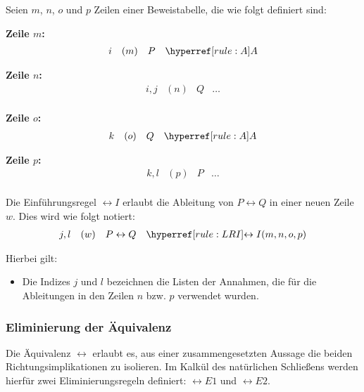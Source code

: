 \documentclass[main.tex]{subfiles}
\begin{document}
\begin{definition}
Seien \( m \), \( n \), \( o \) und \( p \) Zeilen einer Beweistabelle, die wie folgt definiert sind:

\textbf{Zeile \( m \):}
\[
\begin{array}{llll}
    i & (m) & P & \rA \\
\end{array}
\]

\textbf{Zeile \( n \):}
\[
\begin{array}{llll}
    i,j & (n) & Q & \dots \\
\end{array}
\]

\textbf{Zeile \( o \):}
\[
\begin{array}{llll}
    k & (o) & Q & \rA \\
\end{array}
\]

\textbf{Zeile \( p \):}
\[
\begin{array}{llll}
    k,l & (p) & P & \dots \\
\end{array}
\]

Die Einführungsregel \(\leftrightarrow I\) erlaubt die Ableitung von \( P \leftrightarrow Q \) in einer neuen Zeile \( w \). Dies wird wie folgt notiert:
\[
\begin{array}{llll}
    j,l & (w) & P \leftrightarrow Q & \rLRI{m,n,o,p} \\
\end{array}
\]

Hierbei gilt:
\begin{itemize}
    \item Die Indizes \( j \) und \( l \) bezeichnen die Listen der Annahmen, die für die Ableitungen in den Zeilen \( n \) bzw. \( p \) verwendet wurden.
\end{itemize}

\end{definition}

\subsubsection{Eliminierung der Äquivalenz}
\label{rule:LRE1}\label{rule:LRE2}
Die Äquivalenz \(\leftrightarrow\) erlaubt es, aus einer zusammengesetzten Aussage die beiden Richtungsimplikationen zu isolieren. Im Kalkül des natürlichen Schließens werden hierfür zwei Eliminierungsregeln definiert: \(\leftrightarrow E1\) und \(\leftrightarrow E2\).
\end{document}
